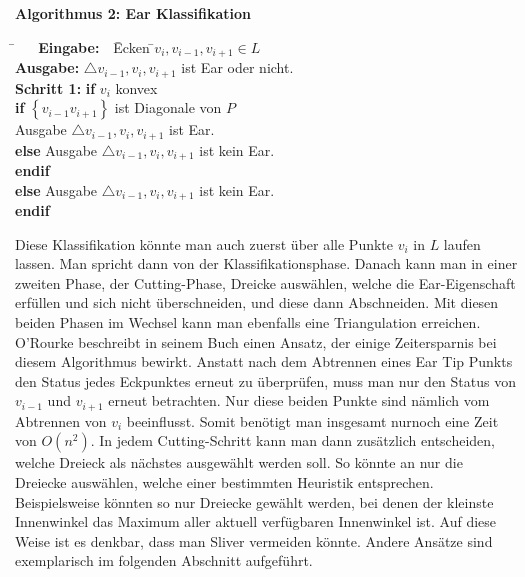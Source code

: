 \begin{flushleft}
  { \textbf{Algorithmus 2: Ear Klassifikation}
        \begin{tabbing}
          \=$~~~~~~$ \= \textbf{Eingabe:} $~~~$\=  Ecken \=${v_i, v_{i-1}, v_{i+1}} \in L$  $~~~~~~~~$\= \\
          \> \> \textbf{Ausgabe:} \> $\triangle v_{i-1}, v_i, v_{i+1}$ ist Ear oder nicht.\\
          \> \> \textbf{Schritt 1:} \>\textbf{if} $v_i$ konvex\\
          \> \> \> \>\textbf{if} $\left\{v_{i-1}v_{i+1}\right\}$ ist Diagonale von $P$\\
          \> \> \> \> \>Ausgabe $\triangle v_{i-1}, v_i, v_{i+1}$ ist Ear.\\
          \> \> \> \> \textbf{else} \>Ausgabe $\triangle v_{i-1}, v_i, v_{i+1}$ ist kein Ear.\\
          \> \> \> \> \textbf{endif}\\
          \> \> \> \textbf{else} Ausgabe $\triangle v_{i-1}, v_i, v_{i+1}$ ist kein Ear.\\
          \> \> \> \textbf{endif}\\
        \end{tabbing}
}
\end{flushleft}
Diese Klassifikation könnte man auch zuerst über alle Punkte $v_i$ in $L$ laufen lassen. Man spricht dann von der Klassifikationsphase. 
Danach kann man in einer zweiten Phase, der Cutting-Phase, Dreicke auswählen, welche die Ear-Eigenschaft erfüllen und sich nicht überschneiden, 
und diese dann Abschneiden. Mit diesen beiden Phasen im Wechsel kann man ebenfalls eine Triangulation erreichen. 
O'Rourke beschreibt in seinem Buch einen Ansatz, der einige Zeitersparnis bei diesem Algorithmus bewirkt.\cite{orourke}
Anstatt nach dem Abtrennen eines Ear Tip Punkts den Status jedes Eckpunktes erneut zu überprüfen, muss man nur den Status von $v_{i-1}$ und $v_{i+1}$ erneut betrachten.
Nur diese beiden Punkte sind nämlich vom Abtrennen von $v_i$ beeinflusst. Somit benötigt man insgesamt nurnoch eine Zeit von $O(n^2)$.\cite{newAlg} 
In jedem Cutting-Schritt kann man dann zusätzlich entscheiden, welche Dreieck als nächstes ausgewählt werden soll. So könnte an nur die Dreiecke auswählen, welche einer bestimmten Heuristik entsprechen.
Beispielsweise könnten so nur Dreiecke gewählt werden, bei denen der kleinste Innenwinkel das Maximum aller aktuell verfügbaren Innenwinkel ist. Auf diese Weise ist es denkbar,
dass man Sliver vermeiden könnte. Andere Ansätze sind exemplarisch im folgenden Abschnitt aufgeführt.